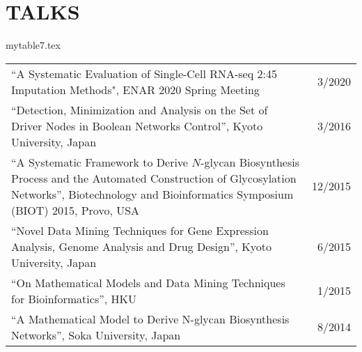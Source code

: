 \documentclass[10pt,letterpaper]{article}
\begin{document}
\section*{TALKS}
\begin{filecontents}{mytable7.tex}
\begin{longtable}{Xr}

``A Systematic Evaluation of Single-Cell RNA-seq 2:45 Imputation Methods", ENAR 2020 Spring Meeting&3/2020\\ %

``Detection, Minimization and Analysis on the Set of Driver Nodes in Boolean Networks Control'', Kyoto University, Japan&3/2016\\

``A Systematic Framework to Derive $N$-glycan Biosynthesis Process and the Automated Construction of Glycosylation Networks'', Biotechnology and Bioinformatics Symposium (BIOT) 2015, Provo, USA&12/2015\\

``Novel Data Mining Techniques for Gene Expression Analysis, Genome Analysis and Drug Design'', Kyoto University, Japan&6/2015\\

``On Mathematical Models and Data Mining Techniques for Bioinformatics'', HKU&1/2015\\

``A Mathematical Model to Derive N-glycan Biosynthesis Networks'', Soka University, Japan&8/2014\\

\end{longtable}
\end{filecontents}

\end{document}
